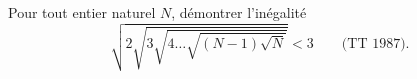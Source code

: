 Pour tout entier naturel $N$, démontrer l'inégalité
\[ \sqrt{2\sqrt{3\sqrt{4\ldots\sqrt{(N - 1)\sqrt{N}}}}} < 3 \qquad \text{(TT 1987).} \]
